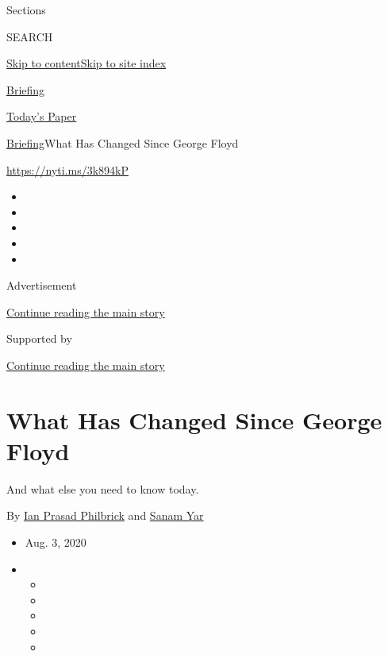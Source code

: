 Sections

SEARCH

\protect\hyperlink{site-content}{Skip to
content}\protect\hyperlink{site-index}{Skip to site index}

\href{https://www.nytimes3xbfgragh.onion/interactive/2018/briefing/global-morning-briefing-newsletter-signup.html}{Briefing}

\href{https://myaccount.nytimes3xbfgragh.onion/auth/login?response_type=cookie\&client_id=vi}{}

\href{https://www.nytimes3xbfgragh.onion/section/todayspaper}{Today's
Paper}

\href{/interactive/2018/briefing/global-morning-briefing-newsletter-signup.html}{Briefing}\textbar{}What
Has Changed Since George Floyd

\url{https://nyti.ms/3k894kP}

\begin{itemize}
\item
\item
\item
\item
\item
\end{itemize}

Advertisement

\protect\hyperlink{after-top}{Continue reading the main story}

Supported by

\protect\hyperlink{after-sponsor}{Continue reading the main story}

\hypertarget{what-has-changed-since-george-floyd}{%
\section{What Has Changed Since George
Floyd}\label{what-has-changed-since-george-floyd}}

And what else you need to know today.

By \href{https://www.nytimes3xbfgragh.onion/by/ian-prasad-philbrick}{Ian
Prasad Philbrick} and
\href{https://www.nytimes3xbfgragh.onion/by/sanam-yar}{Sanam Yar}

\begin{itemize}
\item
  Aug. 3, 2020
\item
  \begin{itemize}
  \item
  \item
  \item
  \item
  \item
  \end{itemize}
\end{itemize}

